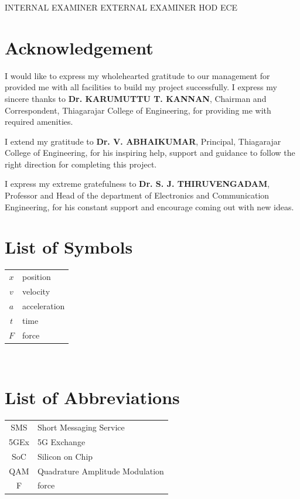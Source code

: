\documentclass[a4paper,12pt]{report} %
\begin{document}
\noindent INTERNAL EXAMINER \hspace{1.5cm} EXTERNAL EXAMINER \hspace{1.5cm}HOD ECE
\chapter*{Acknowledgement}
I would like to express my wholehearted gratitude to our management
for provided me with all facilities to build my project successfully. I express
my sincere thanks to \textbf{Dr. KARUMUTTU T. KANNAN}, Chairman and
Correspondent, Thiagarajar College of Engineering, for providing me with
required amenities.\par
I extend my gratitude to \textbf{Dr. V. ABHAIKUMAR}, Principal,
Thiagarajar College of Engineering, for his inspiring help, support and
guidance to follow the right direction for completing this project.\par
I express my extreme gratefulness to \textbf{Dr. S. J. THIRUVENGADAM},
Professor and Head of the department of Electronics and Communication
Engineering, for his constant support and encourage coming out with new
ideas.

\tableofcontents
\makeatother

\listoffigures
\listoftables
\chapter*{List of Symbols}
\begin{tabular}{cp{}}
  $x$ & position \\
  $v$ & velocity \\
  $a$ & acceleration \\
  $t$ & time \\
  $F$ & force
\end{tabular}\\
\chapter*{List of Abbreviations}
\begin{tabular}{cp{}}
  SMS & Short Messaging Service \\
  5GEx & 5G Exchange \\
  SoC & Silicon on Chip \\
  QAM & Quadrature Amplitude Modulation \\
  F & force
\end{tabular}\\
\end{document}
